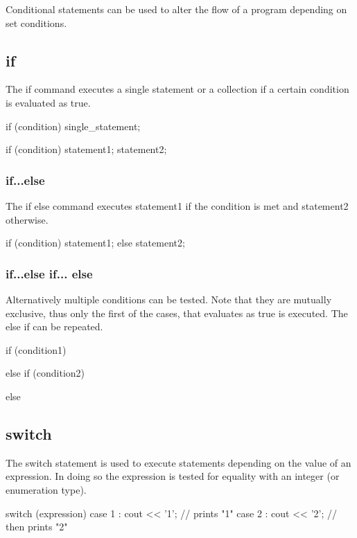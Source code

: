 \documentclass[10pt,a4paper]{scrartcl}
\begin{document}
\begin{multicols*}{2}
Conditional statements can be used to alter the flow of a program depending on set conditions.

\subsection{if}

The if command executes a single statement or a collection if a certain condition is evaluated as true.

\begin{TPCpp}
if (condition) single_statement;

if (condition) {
	statement1;
	statement2;
}
\end{TPCpp} 

\subsubsection{if...else}

The if else command executes statement1 if the condition is met and statement2 otherwise.

\begin{TPCpp}
if (condition) {
	statement1;
}
else {
	statement2;
}
\end{TPCpp} 

\subsubsection{if...else if... else}

Alternatively multiple conditions can be tested. Note that they are mutually exclusive, thus only the first of the cases, that evaluates as true is executed. The else if can be repeated.

\begin{TPCpp}
if (condition1) {

}
else if (condition2) {

}
else {

} 
\end{TPCpp}

\subsection{switch}

The switch statement is used to execute statements depending on the value of an expression. In doing so the expression is tested for equality with an integer (or enumeration type).

\begin{TPCpp}
switch (expression) {
	case 1 : cout << '1'; // prints "1"
	case 2 : cout << '2'; // then prints "2"
}


\end{TPCpp}
\end{multicols*}
\end{document}

